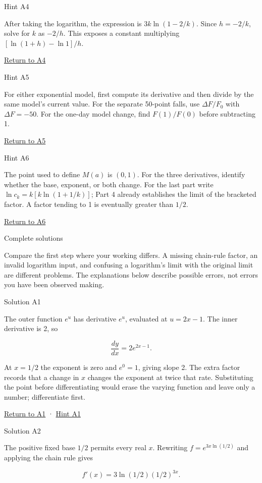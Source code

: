 \documentclass[
  11pt,
]{article}
\begin{document}
Hint A4

After taking the logarithm, the expression is \(3k\ln(1-2/k)\). Since
\(h=-2/k\), solve for \(k\) as \(-2/h\). This exposes a constant
multiplying \([\ln(1+h)-\ln1]/h\).

\protect\hyperlink{task-a4}{Return to A4}

Hint A5

For either exponential model, first compute its derivative and then
divide by the same model's current value. For the separate 50-point
falls, use \(\Delta F/F_0\) with \(\Delta F=-50\). For the one-day model
change, find \(F(1)/F(0)\) before subtracting 1.

\protect\hyperlink{task-a5}{Return to A5}

Hint A6

The point used to define \(M(a)\) is \((0,1)\). For the three
derivatives, identify whether the base, exponent, or both change. For
the last part write \(\ln c_k=k[k\ln(1+1/k)]\); Part 4 already
establishes the limit of the bracketed factor. A factor tending to 1 is
eventually greater than \(1/2\).

\protect\hyperlink{task-a6}{Return to A6}

Complete solutions

Compare the first step where your working differs. A missing chain-rule
factor, an invalid logarithm input, and confusing a logarithm's limit
with the original limit are different problems. The explanations below
describe possible errors, not errors you have been observed making.

Solution A1

The outer function \(e^u\) has derivative \(e^u\), evaluated at
\(u=2x-1\). The inner derivative is 2, so

\[
\frac{dy}{dx}=2e^{2x-1}.
\]

At \(x=1/2\) the exponent is zero and \(e^0=1\), giving slope 2. The
extra factor records that a change in \(x\) changes the exponent at
twice that rate. Substituting the point before differentiating would
erase the varying function and leave only a number; differentiate first.

\protect\hyperlink{task-a1}{Return to A1} ·
\protect\hyperlink{hint-a1}{Hint A1}

Solution A2

The positive fixed base \(1/2\) permits every real \(x\). Rewriting
\(f=e^{3x\ln(1/2)}\) and applying the chain rule gives

\[
f'(x)=3\ln(1/2)(1/2)^{3x}.
\]
\end{document}
